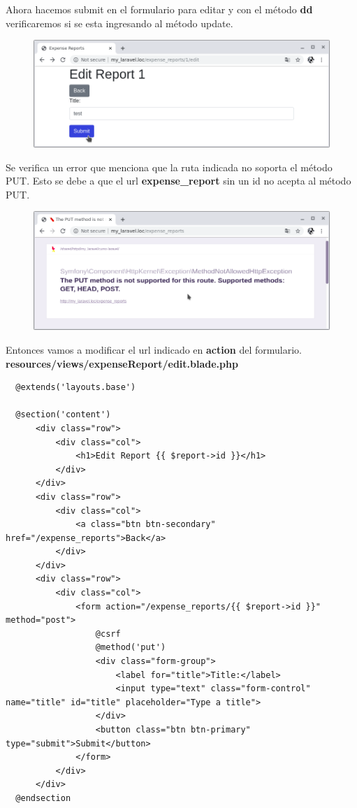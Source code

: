 \documentclass{article}
\begin{document}
Ahora hacemos submit en el formulario para editar y con el método \textbf{dd}
verificaremos si se esta ingresando al método update.\\

\begin{figure}[h!]
  \centering
  \includegraphics[scale=0.5]{./Pictures/072_submit_test.png}
\end{figure}

Se verifica un error que menciona que la ruta indicada no soporta el método
PUT. Esto se debe a que el url \textbf{expense\_report} sin un id no acepta al
método PUT.\\

\newpage

\begin{figure}[h!]
  \centering
  \includegraphics[scale=0.5]{./Pictures/073_error_put.png}
\end{figure}

Entonces vamos a modificar el url indicado en \textbf{action} del formulario.\\

\textbf{resources/views/expenseReport/edit.blade.php}
\begin{verbatim}
  @extends('layouts.base')

  @section('content')
      <div class="row">
          <div class="col">
              <h1>Edit Report {{ $report->id }}</h1>
          </div>
      </div>
      <div class="row">
          <div class="col">
              <a class="btn btn-secondary" href="/expense_reports">Back</a>
          </div>
      </div>
      <div class="row">
          <div class="col">
              <form action="/expense_reports/{{ $report->id }}" method="post">
                  @csrf
                  @method('put')
                  <div class="form-group">
                      <label for="title">Title:</label>
                      <input type="text" class="form-control" name="title" id="title" placeholder="Type a title">
                  </div>
                  <button class="btn btn-primary" type="submit">Submit</button>
              </form>
          </div>
      </div>
  @endsection
\end{verbatim}
\end{document}
